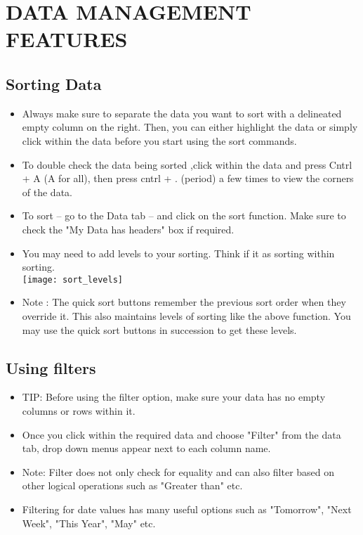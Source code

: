 \documentclass[11pt, oneside]{article}   	%
\begin{document}
\section{DATA MANAGEMENT FEATURES}
\subsection{Sorting Data}
\begin{itemize}
\item Always make sure to separate the data you want to sort with a delineated empty column on the right. Then, you can either highlight the data or simply click within the data before you start using the sort commands.
\item To double check the data being sorted ,click within the data and press Cntrl + A (A for all), then press cntrl + . (period) a few times to view the corners of the data.
\item To sort -- go to the Data tab -- and click on the sort function. Make sure to check the "My Data has headers" box if required.
\item You may need to add levels to your sorting. Think if it as sorting within sorting.
\bigskip\\
\texttt{[image: sort\_levels]}
\bigskip\\
\item Note : The quick sort buttons remember the previous sort order when they override it. This also maintains levels of sorting like the above function. You may use the quick sort buttons in succession to get these levels.
\end{itemize}
\subsection{Using filters}
\begin{itemize}
\item TIP: Before using the filter option, make sure your data has no empty columns or rows within it.
\item Once you click within the required data and choose "Filter" from the data tab, drop down menus appear next to each column name.
\item Note: Filter does not only check for equality and can also filter based on other logical operations such as "Greater than" etc.
\item Filtering for date values has many useful options such as "Tomorrow", "Next Week", "This Year", "May" etc.
\end{itemize}
\end{document}
